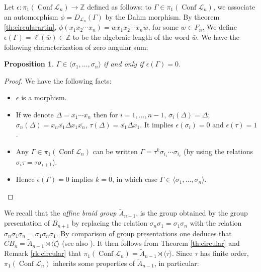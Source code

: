 \documentclass[11pt]{amsart}
\newtheorem{proposition}[theorem]{Proposition}
\begin{document}
Let $\epsilon : \pi_1({\mathop{\mathrm{Conf}}\nolimits} \mathcal{L}_n) \to {\mathbb{Z}}$
defined as follows: to $\Gamma \in \pi_1({\mathop{\mathrm{Conf}}\nolimits} \mathcal{L}_n)$,
we associate an automorphism $\phi = D_{\mathcal{L}_n}(\Gamma)$
by the Dahm morphism.
By theorem \ref{th:circularartin}, $\phi(x_1x_2\cdots x_n) = w  x_1x_2\cdots x_n {\bar{{w}}}$,
for some $w \in F_n$. We define $\epsilon(\Gamma) = \ell({\bar{{w}}}) \in {\mathbb{Z}}$
to be the algebraic length of the word ${\bar{{w}}}$. 
We have the following characterization of zero angular sum:
\begin{proposition}
\label{prop:angmom}
$\Gamma \in \langle \sigma_1,\ldots,\sigma_n\rangle$
if and only if $\epsilon(\Gamma) = 0$.
\end{proposition}

\begin{proof}
We have the following facts:
\begin{itemize}
  \item $\epsilon$ is a morphism.
  \item If we denote $\Delta = x_1\cdots x_n$ then for
 $i=1,\ldots,n-1$, $\sigma_i(\Delta)=\Delta$; 
$\sigma_n(\Delta) =x_n {\bar{{x_1}}} \Delta x_1 {\bar{{x_n}}}$, $\tau(\Delta)={\bar{{x_1}}} \Delta x_1$.
It implies $\epsilon(\sigma_i)=0$ and $\epsilon(\tau)=1$.

  \item Any $\Gamma \in  \pi_1({\mathop{\mathrm{Conf}}\nolimits} \mathcal{L}_n)$ can be written
$\Gamma = \tau^k \sigma_{i_1}\cdots \sigma_{i_\ell}$ (by using the relations 
$\sigma_i \tau = \tau\sigma_{i+1}$).
  
  \item Hence  $\epsilon(\Gamma)=0$ implies  $k=0$, in which case
 $\Gamma \in  \langle \sigma_1,\ldots,\sigma_n\rangle$.
\end{itemize}

\end{proof}

We recall that the {\emph{{affine braid group}}}  $\tilde{A}_{n-1}$, is the group obtained by the group presentation of   $B_{n+1}$ 
 by replacing the relation $\sigma_{n} \sigma _1 =\sigma _1\sigma_{n}$ with the relation $\sigma_{n} \sigma _1\sigma_{n} =\sigma _1\sigma_{n} \sigma _1$.
By comparison of group presentations one deduces that   $CB_n = \tilde{A}_{n-1} \rtimes \langle\zeta\rangle$ (see also \cite{CC,KP}).  It then follows from Theorem \ref{th:circular}
and Remark  \ref{rk:circular} that  $\pi_1({\mathop{\mathrm{Conf}}\nolimits} \mathcal{L}_n)= \tilde{A}_{n-1} \rtimes \langle\tau\rangle$.  Since $\tau$ has finite order, $\pi_1({\mathop{\mathrm{Conf}}\nolimits} \mathcal{L}_n)$
inherits some properties of  $\tilde{A}_{n-1}$, in particular:
\end{document}
